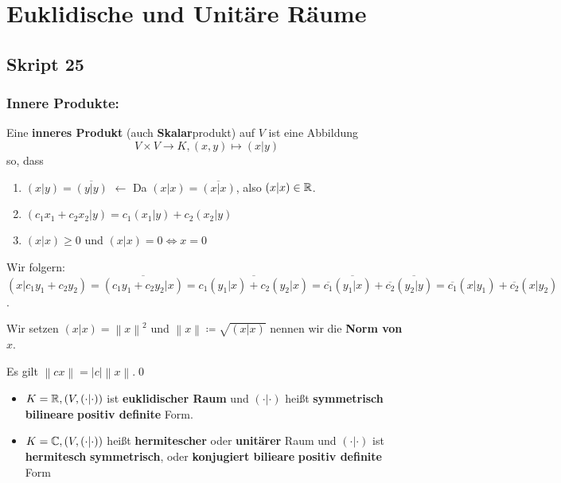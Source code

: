 \section{Euklidische und Unitäre Räume}
\setcounter{subsection}{24}
\subsection{Skript 25}
\setcounter{subsubsection}{14}
\subsubsection{Innere Produkte:}
\setcounter{subenvironmentnumber}{-1}
\begin{subdefinition}
	Eine \textbf{inneres Produkt} (auch \textbf{Skalar}produkt) auf $ V $ ist eine Abbildung
	\[
		V \times V \to K, (x, y) \mapsto (x | y)
	\]
	so, dass
	\begin{enumerate}[label=(\arabic*)]
		\item $ (x|y) = \overline{(y|y)}  $ {\color{gadse-orange} $ \leftarrow $ Da $ (x|x) = \overline{(x|x)}  $, also $ (x|x) \in \mathbb{R}  $.}
		\item $ (c_1x_1 + c_2x_2|y) = c_1(x_1|y) + c_2(x_2|y) $ 
		\item $ (x|x) \geq 0 $ und $ (x|x) = 0 \iff x = 0 $
	\end{enumerate}
\end{subdefinition}

\begin{subnote}[Bemerkung]
	Wir folgern: $ (x|c_1y_1 + c_2y_2) = \overline{(c_1y_1 + c_2y_2| x)} = \overline{c_1(y_1|x) + c_2(y_2|x)} = \overline{c_1} \overline{(y_1|x)} + \overline{c_2} \overline{(y_2|y)} = \overline{c_1} (x|y_1) + \overline{c_2} (x|y_2) $.
\end{subnote}

Wir setzen $ (x|x) = \left\| x \right\| ^2 $ und $ \left\| x \right\| \coloneqq \sqrt{(x|x)}  $ nennen wir die \textbf{Norm von $ x $}.

\begin{subnote}[Bemerkung]
	Es gilt $ \left\| cx \right\| = \left| c \right| \left\| x \right\|  $.\qed
\end{subnote}

\begin{subdefinition*}[Terminologie]
	\begin{itemize}
		\item $ K = \mathbb{R} , \left( V, ( \cdot | \cdot ) \right)  $ ist \textbf{euklidischer Raum} und $ ( \cdot | \cdot ) $ heißt \textbf{symmetrisch} \textbf{bilineare} \textbf{positiv definite} Form.
		\item $ K = \mathbb{C}, \left( V, ( \cdot | \cdot ) \right)  $ heißt \textbf{hermitescher} oder \textbf{unitärer} Raum und $ ( \cdot | \cdot ) $ ist \textbf{hermitesch} \textbf{symmetrisch}, oder \textbf{konjugiert bilieare} \textbf{positiv definite} Form
	\end{itemize}
\end{subdefinition*}

